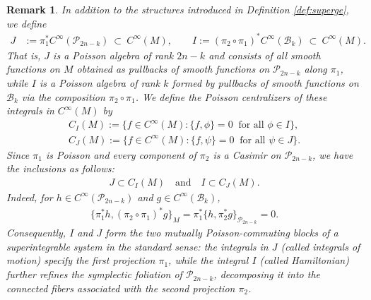 \documentclass[11pt]{amsart}
\theoremstyle{definition}
\theoremstyle{plain}
\newtheorem{remark}[theorem]{Remark}
\theoremstyle{conclusion}
\begin{document}
 \begin{remark}
 \label{rkm:ijc}
        In addition to the structures introduced in Definition \ref{def:superge}, we define
\begin{align*}
J &:= \pi_1^* C^\infty(\mathcal{P}_{2n-k}) \ \subset\ C^\infty(M), \qquad 
I := (\pi_2 \circ \pi_1)^* C^\infty(\mathcal{B}_k) \ \subset\ C^\infty(M).
\end{align*}
That is, $J$ is a Poisson algebra of rank $2n -k$ and consists of all smooth functions on $M$ obtained as pullbacks of smooth functions on $\mathcal{P}_{2n-k}$ along $\pi_1$, while $I$ is a Poisson algebra of rank $k$ formed by pullbacks of smooth functions on $\mathcal{B}_k$ via the composition $\pi_2 \circ \pi_1$.
We define the Poisson centralizers of these integrals in $C^\infty(M)$ by
\begin{align*}
C_I(M) := \bigl\{f\in C^\infty(M) : \{f,\phi\}=0\ \text{ for all }\phi\in I\bigr\},\\
C_J(M) := \bigl\{f\in C^\infty(M):\{f,\psi\}=0\ \text{ for all }\psi\in J\bigr\}.
\end{align*} Since $\pi_1$ is Poisson and every component of $\pi_2$ is a Casimir on $\mathcal{P}_{2n-k}$, we have the inclusions as follows: \begin{align*}
J \subset C_I(M) \quad\text{and}\quad I \subset C_J(M).
\end{align*} Indeed, for $h\in C^\infty(\mathcal{P}_{2n-k})$ and $g\in C^\infty(\mathcal{B}_k)$,\begin{align*}
\bigl\{\pi_1^*h,(\pi_2 \circ \pi_1)^*g\bigr\}_M=\pi_1^*\bigl\{h,\pi_2^*g\bigr\}_{\mathcal{P}_{2n-k}}=0.
\end{align*}
Consequently, $I$ and $J$ form the two mutually Poisson-commuting blocks of a superintegrable system in the standard sense: the integrals in $J$ (called integrals of motion) specify the first projection $\pi_1$, while the integral $I$ (called Hamiltonian) further refines the symplectic foliation of $\mathcal{P}_{2n-k}$, decomposing it into the connected fibers associated with the second projection $\pi_2$.
 \end{remark}

\end{document}
